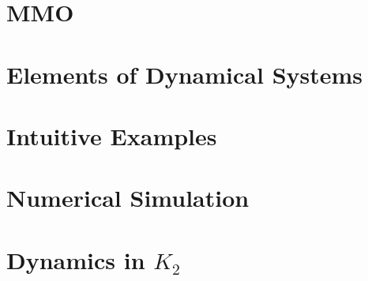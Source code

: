\documentclass{article}
\begin{document}
\section{MMO}


\newpage 


\nocite{strogatz2007nonlinear}

\newpage
\appendix
\section{Elements of Dynamical Systems}\label{app:DynSys}


\section{Intuitive Examples}\label{sec:definitions}%

\section{Numerical Simulation}\label{app:NumSim}
 
\section{Dynamics in \texorpdfstring{$K_2$}{K2}}
\end{document}
